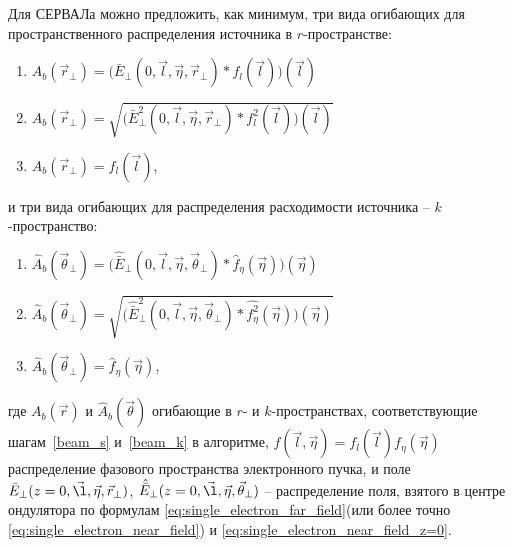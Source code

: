 Для СЕРВАЛа можно предложить, как минимум, три вида огибающих для пространственного распределения источника в $r$-пространстве:
\begin{enumerate}[label=\Roman*.]
	\item \label{amplitude} ${A}_{b} (\vec{r}_{\bot}) = \big(\bar{E}_{\bot}(0, \vec{l}, \vec{\eta}, \vec{r}_{\bot}) \ast f_l(\vec{l})\big)(\vec{l})$ \\

	\item \label{intensity} ${A}_{b} (\vec{r}_{\bot}) = \sqrt{\big(\bar{E}^2_{\bot}(0,  \vec{l}, \vec{\eta}, \vec{r}_{\bot}) \ast f_l^2(\vec{l})\big)(\vec{l})}$ \\

	\item \label{e-beam} ${A}_{b} (\vec{r}_{\bot}) = f_l(\vec{l})$,
\end{enumerate}
и три вида огибающих для распределения расходимости источника -- $k$-пространство:
\begin{enumerate}[label=\Roman*.]
	\item \label{amplitude} $\hat{{A}}_{b} (\vec{\theta}_{\bot}) = \big(\hat{\bar{E}}_{\bot}(0,  \vec{l}, \vec{\eta}, \vec{\theta}_{\bot}) \ast \hat{f}_{\eta}(\vec{\eta})\big)(\vec{\eta})$\\
	
	\item \label{intensity} $\hat{{A}}_{b} (\vec{\theta}_{\bot}) = \sqrt{\big(\hat{\bar{E}}^2_{\bot}(0,  \vec{l}, \vec{\eta}, \vec{\theta}_{\bot}) \ast \hat{f_{\eta}^2}(\vec{\eta})\big)(\vec{\eta})}$\\
	
	\item \label{e-beam} $\hat{{A}}_{b} (\vec{\theta}_{\bot}) = \hat{f}_{\eta}(\vec{\eta})$,
\end{enumerate}
где ${A}_{b} (\vec{r})$ и $\hat{{A}}_{b} (\vec{\theta})$ огибающие в $r$- и $k$-пространствах, соответствующие шагам~\ref{beam_s} и~\ref{beam_k} в алгоритме,  $f(\vec{l}, \vec{\eta}) = f_l(\vec{l}) f_{\eta}(\vec{\eta})$ распределение фазового пространства электронного пучка, и поле $\bar{E}_{\bot}(z=0, \vec{\l}, \vec{\eta}, \vec{r}_{\bot})$, $\hat{\bar{E}}_{\bot}(z=0 , \vec{\l}, \vec{\eta}, \vec{\theta}_{\bot})$ -- распределение поля, взятого в центре ондулятора по формулам \ref{eq:single_electron_far_field}(или более точно \ref{eq:single_electron_near_field}) и \ref{eq:single_electron_near_field_z=0}.

